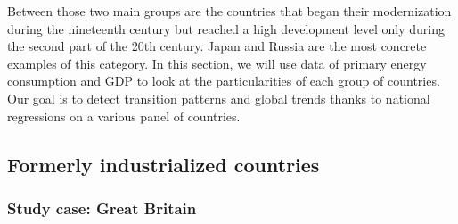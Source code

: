 \documentclass[conference]{IEEEtran}
\begin{document}
Between those two main groups are the countries that began their modernization during the nineteenth century but reached a high development level only during the second part of the 20th century. Japan and Russia are the most concrete examples of this category. 
In this section, we will use data of primary energy consumption and GDP to look at the particularities of each group of countries. Our goal is to detect transition patterns and global trends thanks to national regressions on a various panel of countries. 

\subsection{Formerly industrialized countries}
\subsubsection{Study case: Great Britain} 
\end{document}
